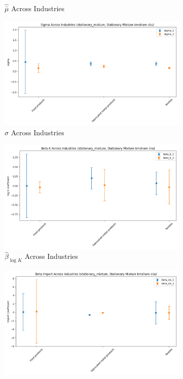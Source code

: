\documentclass{article}
\begin{document}
\begin{figure}[ht!]
\begin{subfigure}[t]{0.32\textwidth}
        \caption{$\hat{\bar\mu}$ Across Industries}
    \end{subfigure}

    \begin{subfigure}[t]{0.32\textwidth}
        \centering
        \includegraphics[width=\textwidth]{figure/stationary_mixture_kmshare_ciiu_sigma_across_industries.png}
        \caption{$\hat\sigma$ Across Industries}
    \end{subfigure}
    \begin{subfigure}[t]{0.32\textwidth}
        \centering
        \includegraphics[width=\textwidth]{figure/stationary_mixture_kmshare_ciiu_beta_k_across_industries.png}
        \caption{$\hat{\beta}_{\log K}$ Across Industries}
    \end{subfigure}
    \begin{subfigure}[t]{0.32\textwidth}
        \centering
        \includegraphics[width=\textwidth]{figure/stationary_mixture_kmshare_ciiu_beta_im_across_industries.png}

\end{subfigure}
\end{figure}
\end{document}
